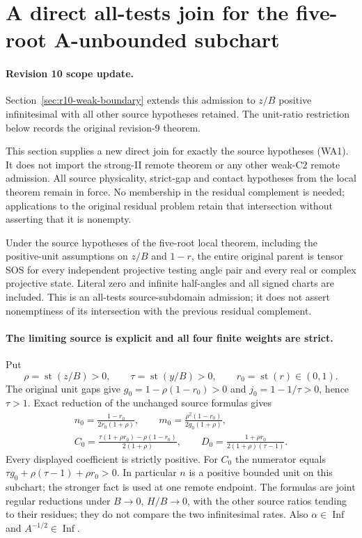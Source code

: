 \section{A direct all-tests join for the five-root A-unbounded subchart}
\label{sec:r9-weak-A-remote}

\paragraph{Revision 10 scope update.}
Section~\ref{sec:r10-weak-boundary} extends this admission to $z/B$
positive infinitesimal with all other source hypotheses retained.
The unit-ratio restriction below records the original revision-9 theorem.

This section supplies a new direct join for exactly the source
hypotheses (WA1). It does not import the strong-II remote theorem
or any other weak-C2 remote admission. All source physicality,
strict-gap and contact hypotheses from the local theorem remain
in force. No membership in the residual complement is needed;
applications to the original residual problem retain that intersection
without asserting that it is nonempty.

\begin{theorem}
Under the source hypotheses of the five-root local theorem, including
the positive-unit assumptions on $z/B$ and $1-r$, the entire original
parent is tensor SOS for every independent projective testing angle
pair and every real or complex projective state. Literal zero and
infinite half-angles and all signed charts are included.
This is an all-tests source-subdomain admission; it does not assert
nonemptiness of its intersection with the previous residual complement.
\end{theorem}

\paragraph{The limiting source is explicit and all four finite weights are strict.}
Put
\[
 \rho=\operatorname{st}(z/B)>0,\qquad
 \tau=\operatorname{st}(y/B)>0,\qquad
 r_0=\operatorname{st}(r)\in(0,1).
\]
The original unit gaps give
$g_0=1-\rho(1-r_0)>0$ and
$j_0=1-1/\tau>0$, hence $\tau>1$.
Exact reduction of the unchanged source formulas gives
\[
 \begin{gathered}
 n_0=\frac{1-r_0}{2r_0(1+\rho)},\qquad
 m_0=\frac{\rho^2(1-r_0)}{2g_0(1+\rho)},\\
 C_0=\frac{\tau(1+\rho r_0)-\rho(1-r_0)}{2(1+\rho)},\qquad
 D_0=\frac{1+\rho r_0}{2(1+\rho)(\tau-1)}.             \tag{WR1}
 \end{gathered}
\]
Every displayed coefficient is strictly positive. For $C_0$ the
numerator equals $\tau g_0+\rho(\tau-1)+\rho r_0>0$.
In particular $n$ is a positive bounded unit on this subchart;
the stronger fact is used at one remote endpoint. The formulas
are joint regular reductions under $B\to0$, $H/B\to0$, with
the other source ratios tending to their residues; they do not
compare the two infinitesimal rates. Also
$\alpha\in\operatorname{Inf}$ and $A^{-1/2}\in\operatorname{Inf}$.

